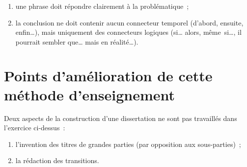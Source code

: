 \documentclass[a4paper,12pt]{report}
\begin{document}
\begin{enumerate}
\item une phrase doit répondre clairement à la problématique ;
\item la conclusion ne doit contenir aucun connecteur temporel (d'abord,
ensuite, enfin\ldots{}), mais uniquement des connecteurs logiques (si\ldots{}
alors, même si\ldots{}, il pourrait sembler que\ldots{} mais en réalité\ldots{}).
\end{enumerate}


\chapter{Points d'amélioration de cette méthode d'enseignement}
\label{sec:org67edf95}

Deux aspects de la construction d'une dissertation ne sont pas
travaillés dans l'exercice ci-dessus :
\begin{enumerate}
\item l'invention des titres de grandes parties (par opposition aux
sous-parties) ;
\item la rédaction des transitions.
\end{enumerate}
\end{document}

